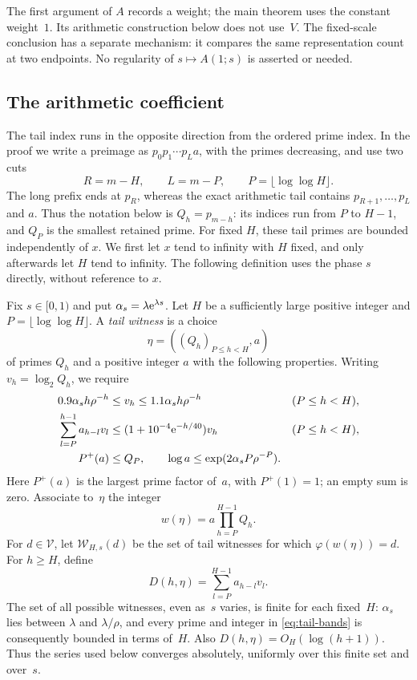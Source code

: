 The first argument of $A$ records a weight; the main theorem uses the
constant weight~$1$. Its arithmetic construction below does not use~$V$.
The fixed-scale conclusion has a separate mechanism: it compares the same
representation count at two endpoints. No regularity of
$s\mapsto A(1;s)$ is asserted or needed.

\subsection{The arithmetic coefficient}\label{subsec:coefficient}
The tail index runs in the opposite direction from the ordered prime
index. In the proof we write a preimage as
$p_0p_1\cdots p_La$, with the primes decreasing, and use two cuts
\[
 R=m-H,\qquad L=m-P,\qquad P=\lfloor\log\log H\rfloor.
\]
The long prefix ends at $p_R$, whereas the exact arithmetic tail
contains $p_{R+1},\ldots,p_L$ and $a$. Thus the notation below is
$Q_h=p_{m-h}$: its indices run from $P$ to $H-1$, and $Q_P$ is the
smallest retained prime. For fixed $H$, these tail primes are bounded
independently of $x$. We first let $x$ tend to infinity with $H$ fixed,
and only afterwards let $H$ tend to infinity. The following definition
uses the phase $s$ directly, without reference to $x$.

Fix $s\in[0,1)$ and put $\alpha_s=\lambda\mathrm e^{\lambda s}$. Let $H$ be a sufficiently large positive integer and $P=\lfloor\log\log H\rfloor$. A \emph{tail witness} is a choice
\[
 \eta=((Q_h)_{P\le h<H},a)
\]
of primes $Q_h$ and a positive integer $a$ with the following properties. Writing $v_h=\log_2Q_h$, we require
\begin{equation}\label{eq:tail-bands}
 \begin{aligned}
 0.9\alpha_s h\rho^{-h}&\le v_h\le1.1\alpha_s h\rho^{-h}
          &&(P\le h<H),\\
 \sum_{l=P}^{h-1}a_{h-l}v_l
   &\le(1+10^{-4}\mathrm e^{-h/40})v_h
          &&(P\le h<H),\\
 P^+(a)&\le Q_P,\qquad
 \log a\le\exp(2\alpha_sP\rho^{-P}).
 \end{aligned}
\end{equation}
Here $P^+(a)$ is the largest prime factor of~$a$, with $P^+(1)=1$; an empty sum is zero. Associate to~$\eta$ the integer
\[
 w(\eta)=a\prod_{h=P}^{H-1}Q_h.
\]
For $d\in\mathcal V$, let $\mathcal W_{H,s}(d)$ be the set of tail witnesses for which $\varphi(w(\eta))=d$. For $h\ge H$, define
\begin{equation}\label{eq:tail-D}
 D(h,\eta)=\sum_{l=P}^{H-1}a_{h-l}v_l.
\end{equation}
The set of all possible witnesses, even as~$s$ varies, is finite for each fixed~$H$: $\alpha_s$ lies between $\lambda$ and $\lambda/\rho$, and every prime and integer in \eqref{eq:tail-bands} is consequently bounded in terms of~$H$. Also $D(h,\eta)=O_H(\log(h+1))$. Thus the series used below converges absolutely, uniformly over this finite set and over~$s$.

